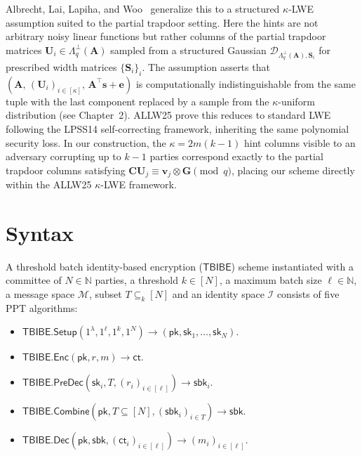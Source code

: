 Albrecht, Lai, Lapiha, and Woo~\cite{AC:ALLW25} generalize this to a
structured $\kappa$-LWE assumption suited to the partial trapdoor setting. Here
the hints are not arbitrary noisy linear functions but rather columns of the
partial trapdoor matrices $\mathbf{U}_i \in \Lambda_q^\perp(\mathbf{A})$
sampled from a structured Gaussian
$\mathcal{D}_{\Lambda_q^\perp(\mathbf{A}),\mathbf{S}_i}$ for prescribed width
matrices $\{\mathbf{S}_i\}_i$. The assumption asserts that
$(\mathbf{A},\,(\mathbf{U}_i)_{i\in[\kappa]},\,\mathbf{A}^\top\mathbf{s}+\mathbf{e})$
is computationally indistinguishable from the same tuple with the last component
replaced by a sample from the $\kappa$-uniform distribution (see Chapter~2).
ALLW25 prove this reduces to standard LWE following the LPSS14 self-correcting
framework, inheriting the same polynomial security loss. In our construction,
the $\kappa = 2m(k-1)$ hint columns visible to an adversary corrupting up to
$k-1$ parties correspond exactly to the partial trapdoor columns satisfying
$\mathbf{C}\mathbf{U}_j \equiv \mathbf{v}_j \otimes \mathbf{G} \pmod{q}$,
placing our scheme directly within the ALLW25 $\kappa$-LWE framework.

\section{Syntax}


A threshold batch identity-based encryption (\(\mathsf{TBIBE}\)) scheme instantiated with a committee of \(N \in \mathbb{N}\) parties, a threshold \(k \in [N]\), a maximum batch size \(\ell \in \mathbb{N}\), a message space \(\mathcal{M}\), subset $T \subseteq_k [N]$ and an identity space \(\mathcal{I}\) consists of five PPT algorithms:
\begin{itemize}
    \item
    $
    \mathsf{TBIBE.Setup}(1^\lambda,1^\ell,1^k, 1^N)\rightarrow (\mathsf{pk},\mathsf{sk}_1,\ldots,\mathsf{sk}_N).
    $

    \item
    $
    \mathsf{TBIBE.Enc}(\mathsf{pk},r,m)\rightarrow \mathsf{ct}.
    $

    \item
    $
    \mathsf{TBIBE.PreDec}(\mathsf{sk}_i,T, (r_i)_{i\in[\ell]})\rightarrow \mathsf{sbk}_i.
    $

    \item
    $
    \mathsf{TBIBE.Combine}(\mathsf{pk},T\subseteq [N],(\mathsf{sbk}_i)_{i\in T})\rightarrow \mathsf{sbk}.
    $

    \item
    $
    \mathsf{TBIBE.Dec}(\mathsf{pk},\mathsf{sbk},(\mathsf{ct}_i)_{i\in[\ell]})\rightarrow (m_i)_{i\in[\ell]}.
    $
\end{itemize}

